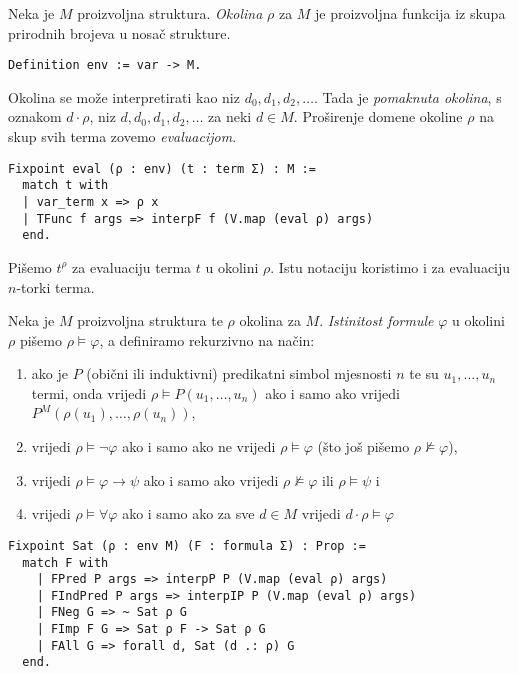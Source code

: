 \begin{definition}
  Neka je \(M\) proizvoljna struktura. \textit{Okolina} \(\rho\) za \(M\) je proizvoljna funkcija iz skupa prirodnih brojeva u nosač strukture.
\begin{verbatim}
Definition env := var -> M.
\end{verbatim}
  \noindent Okolina se može interpretirati kao niz \(d_{0}, d_{1}, d_{2}, \ldots\). Tada je \textit{pomaknuta okolina}, s oznakom \(d \cdot \rho\),
  niz \(d, d_{0}, d_{1}, d_{2}, \ldots\) za neki \(d \in M\).
  \noindent Proširenje domene okoline \(\rho\) na skup svih terma zovemo \textit{evaluacijom}.
\begin{verbatim}
Fixpoint eval (ρ : env) (t : term Σ) : M :=
  match t with
  | var_term x => ρ x
  | TFunc f args => interpF f (V.map (eval ρ) args)
  end.
\end{verbatim}
  Pišemo \(t^{\rho}\) za evaluaciju terma \(t\) u okolini \(\rho\).
  Istu notaciju koristimo i za evaluaciju \(n\)-torki terma.
\end{definition}

\begin{definition}
  Neka je \(M\) proizvoljna struktura te \(\rho\) okolina za \(M\).
  \textit{Istinitost formule} \(\varphi\) u okolini \(\rho\) pišemo \(\rho \vDash \varphi\),
  a definiramo rekurzivno na način:
  \begin{enumerate}
  \item ako je \(P\) (obični ili induktivni) predikatni simbol mjesnosti \(n\)
    te su \(u_{1}, \ldots, u_{n}\) termi,
    onda vrijedi \(\rho \vDash P(u_{1}, \ldots, u_{n})\) ako i samo ako vrijedi \(P^{M}(\rho(u_{1}), \ldots, \rho(u_{n}))\),
  \item vrijedi \(\rho \vDash \neg \varphi \) ako i samo ako ne vrijedi \(\rho \vDash \varphi\) (što još pišemo \(\rho \not \vDash \varphi\)),
  \item vrijedi \(\rho \vDash \varphi \rightarrow \psi \) ako i samo ako vrijedi \(\rho \not \vDash \varphi\) ili \(\rho \vDash \psi\) i
  \item vrijedi \(\rho \vDash \forall \varphi\) ako i samo ako za sve \(d \in M\) vrijedi \(d \cdot \rho \vDash \varphi\)
  \end{enumerate}
\begin{verbatim}
Fixpoint Sat (ρ : env M) (F : formula Σ) : Prop :=
  match F with
    | FPred P args => interpP P (V.map (eval ρ) args)
    | FIndPred P args => interpIP P (V.map (eval ρ) args)
    | FNeg G => ~ Sat ρ G
    | FImp F G => Sat ρ F -> Sat ρ G
    | FAll G => forall d, Sat (d .: ρ) G
  end.
\end{verbatim}
\end{definition}

